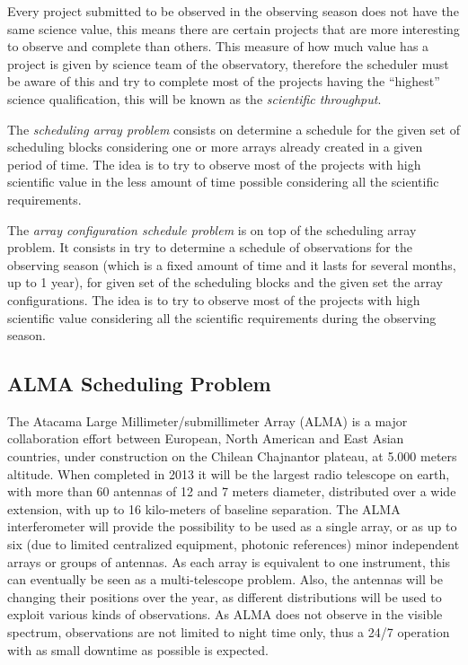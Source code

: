 \documentclass[11pt]{article}
\begin{document}
Every project submitted to be observed in the observing season does not have the same science value, this means there are certain projects that are more interesting to observe and complete than others. This measure of how much value has a project is given by science team of the observatory, therefore the scheduler must be aware of this and try to complete most of the projects having the ``highest'' science qualification, this will be known as the \textit{scientific throughput}.

The \textit{scheduling array problem} consists on determine a schedule for the given set of scheduling blocks considering one or more arrays already created in a given period of time. The idea is to try to observe most of the projects with high scientific value in the less amount of time possible considering all the scientific requirements.

The \textit{array configuration schedule problem} is on top of the scheduling array problem. It consists in try to determine a schedule of observations for the observing season (which is a fixed amount of time and it lasts for several months, up to 1 year), for given set of the scheduling blocks and the given set the array configurations. The idea is to try to observe most of the projects with high scientific value considering all the scientific requirements during the observing season.

\subsection{ALMA Scheduling Problem}
The Atacama Large Millimeter/submillimeter Array (ALMA) is a major collaboration effort between European, North American and East Asian countries, under construction on the Chilean Chajnantor plateau, at 5.000 meters altitude. When completed in 2013 it will be the largest radio telescope on earth, with more than 60 antennas of 12 and 7 meters diameter, distributed over a wide extension, with up to 16 kilo-meters of baseline separation. The ALMA interferometer will provide the possibility to be used as a single array, or as up to six (due to limited centralized equipment, photonic references) minor independent arrays or groups of antennas. As each array is equivalent to one instrument, this can eventually be seen as a multi-telescope problem. Also, the antennas will be changing their positions over the year, as different distributions will be used to exploit various kinds of observations. As ALMA does not observe in the visible spectrum, observations are not limited to night time only, thus a 24/7 operation with as small downtime as possible is expected. 
\end{document}
